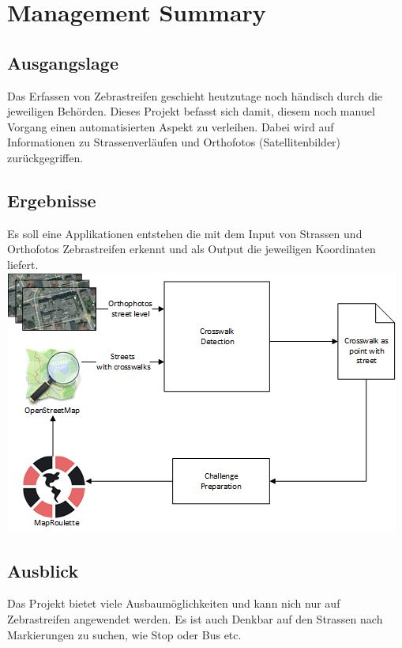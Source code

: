 \chapter*{Management Summary}
\section{Ausgangslage}
Das Erfassen von Zebrastreifen geschieht heutzutage noch händisch durch die jeweiligen Behörden.
Dieses Projekt befasst sich damit, diesem noch manuel Vorgang einen automatisierten Aspekt zu verleihen.
Dabei wird auf Informationen zu Strassenverläufen und Orthofotos (Satellitenbilder) zurückgegriffen. 
\section{Ergebnisse}
Es soll eine Applikationen entstehen die mit dem Input von Strassen und Orthofotos Zebrastreifen erkennt und als Output die jeweiligen Koordinaten liefert.
\includegraphics[width=\textwidth]{images/management_summary_1.png}
\section{Ausblick}
Das Projekt bietet viele Ausbaumöglichkeiten und kann nich nur auf Zebrastreifen angewendet werden. Es ist auch Denkbar auf den Strassen nach Markierungen zu suchen, wie Stop oder Bus etc.